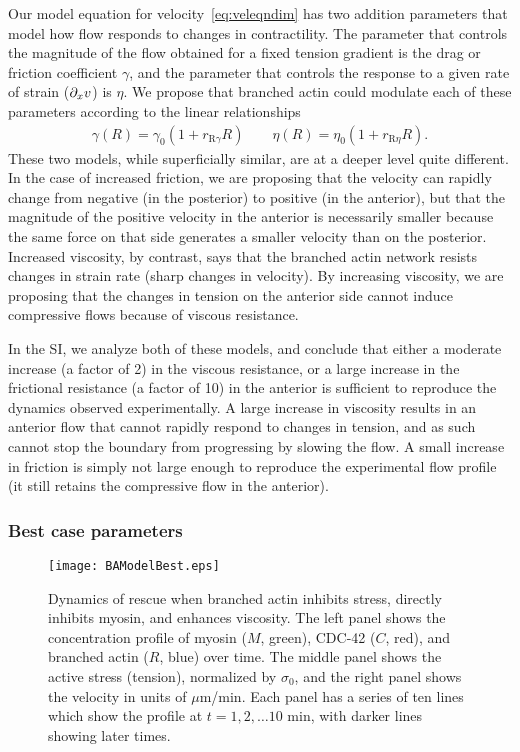\documentclass[11pt]{article}
\newcommand{\6}[1]{#1_{\text{6}}}
\newcommand{\3}[1]{#1_{\text{3}}}
\begin{document}
Our model equation for velocity\ \eqref{eq:veleqndim} has two addition parameters that model how flow responds to changes in contractility. The parameter that controls the magnitude of the flow obtained for a fixed tension gradient is the drag or friction coefficient $\gamma$, and the parameter that controls the response to a given rate of strain ($\partial_x v$) is $\eta$. We propose that branched actin could modulate each of these parameters according to the linear relationships
\begin{gather*}
\gamma(R)=\gamma_0 \left(1+r_\text{R$\gamma$}R\right) \qquad \eta(R)=\eta_0\left(1+r_\text{R$\eta$} R\right).
\end{gather*}
These two models, while superficially similar, are at a deeper level quite different. In the case of increased friction, we are proposing that the velocity can rapidly change from negative (in the posterior) to positive (in the anterior), but that the magnitude of the positive velocity in the anterior is necessarily smaller because the same force on that side generates a smaller velocity than on the posterior. Increased viscosity, by contrast, says that the branched actin network resists changes in strain rate (sharp changes in velocity). By increasing viscosity, we are proposing that the changes in tension on the anterior side cannot induce compressive flows because of viscous resistance.

In the SI, we analyze both of these models, and conclude that either a moderate increase (a factor of 2) in the viscous resistance, or a large increase in the frictional resistance (a factor of 10) in the anterior is sufficient to reproduce the dynamics observed experimentally. A large increase in viscosity results in an anterior flow that cannot rapidly respond to changes in tension, and as such cannot stop the boundary from progressing by slowing the flow. A small increase in friction is simply not large enough to reproduce the experimental flow profile (it still retains the compressive flow in the anterior). 

\subsubsection{Best case parameters}
\begin{figure}
\centering
\texttt{[image: BAModelBest.eps]}
\caption{\label{fig:BABest} Dynamics of rescue when branched actin inhibits stress, directly inhibits myosin, and enhances viscosity. The left panel shows the concentration profile of myosin ($M$, green), CDC-42 ($C$, red), and branched actin ($R$, blue) over time. The middle panel shows the active stress (tension), normalized by $\sigma_0$, and the right panel shows the velocity in units of $\mu$m/min. Each panel has a series of ten lines which show the profile at $t=1, 2, \dots 10$ min, with darker lines showing later times.}
\end{figure}
\end{document}
